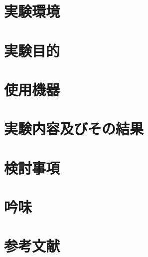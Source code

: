 \documentclass[uplatex, dvipdfmx, a4paper]{ujarticle}
\begin{document}
\section{実験環境}
\section{実験目的}
\section{使用機器}
\section{実験内容及びその結果}
\section{検討事項}
\section{吟味}
\section{参考文献}
\end{document}
